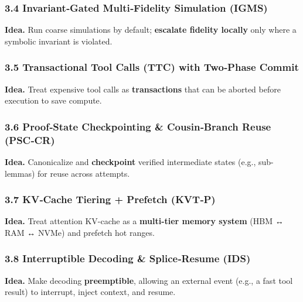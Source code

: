 \documentclass[
]{article}
\begin{document}
\hypertarget{invariantgated-multifidelity-simulation-igms}{%
\subsubsection{3.4 Invariant‑Gated Multi‑Fidelity Simulation
(IGMS)}\label{invariantgated-multifidelity-simulation-igms}}

\textbf{Idea.} Run coarse simulations by default; \textbf{escalate
fidelity locally} only where a symbolic invariant is violated.

\hypertarget{transactional-tool-calls-ttc-with-twophase-commit}{%
\subsubsection{3.5 Transactional Tool Calls (TTC) with Two‑Phase
Commit}\label{transactional-tool-calls-ttc-with-twophase-commit}}

\textbf{Idea.} Treat expensive tool calls as \textbf{transactions} that
can be aborted before execution to save compute.

\hypertarget{proofstate-checkpointing-cousinbranch-reuse-psccr}{%
\subsubsection{3.6 Proof‑State Checkpointing \& Cousin‑Branch Reuse
(PSC‑CR)}\label{proofstate-checkpointing-cousinbranch-reuse-psccr}}

\textbf{Idea.} Canonicalize and \textbf{checkpoint} verified
intermediate states (e.g., sub-lemmas) for reuse across attempts.

\hypertarget{kvcache-tiering-prefetch-kvtp}{%
\subsubsection{3.7 KV‑Cache Tiering + Prefetch
(KVT‑P)}\label{kvcache-tiering-prefetch-kvtp}}

\textbf{Idea.} Treat attention KV-cache as a \textbf{multi-tier memory
system} (HBM ↔ RAM ↔ NVMe) and prefetch hot ranges.

\hypertarget{interruptible-decoding-spliceresume-ids}{%
\subsubsection{3.8 Interruptible Decoding \& Splice‑Resume
(IDS)}\label{interruptible-decoding-spliceresume-ids}}

\textbf{Idea.} Make decoding \textbf{preemptible}, allowing an external
event (e.g., a fast tool result) to interrupt, inject context, and
resume.
\end{document}
